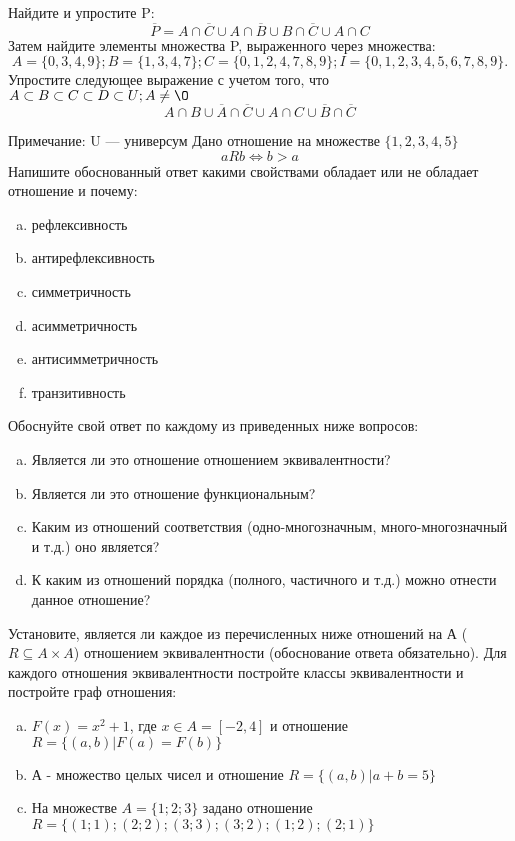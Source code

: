\documentclass[10pt]{exam}
\begin{document}
\begin{questions}
\question
Найдите и упростите P:
\begin{equation*}
\overline{P} = A \cap \overline{C} \cup A \cap \overline{B} \cup B \cap \overline{C} \cup A \cap C
\end{equation*}
Затем найдите элементы множества P, выраженного через множества:
\begin{equation*}
A = \{0, 3, 4, 9\}; 
B = \{1, 3, 4, 7\};
C = \{0, 1, 2, 4, 7, 8, 9\};
I = \{0, 1, 2, 3, 4, 5, 6, 7, 8, 9\}.
\end{equation*}\question
Упростите следующее выражение с учетом того, что $A\subset B \subset C \subset D \subset U; A \neq \O$
\begin{equation*}
A \cap B \cup \overline{A} \cap \overline{C} \cup A \cap C \cup \overline{B} \cap \overline{C}
\end{equation*}

Примечание: U — универсум\question
Дано отношение на множестве $\{1, 2, 3, 4, 5\}$ 
\begin{equation*}
aRb \iff b > a
\end{equation*}
Напишите обоснованный ответ какими свойствами обладает или не обладает отношение и почему:   
\begin{enumerate} [a)]\setcounter{enumi}{0}
\item рефлексивность
\item антирефлексивность
\item симметричность
\item асимметричность
\item антисимметричность
\item транзитивность
\end{enumerate}

Обоснуйте свой ответ по каждому из приведенных ниже вопросов:
\begin{enumerate} [a)]\setcounter{enumi}{0}
    \item Является ли это отношение отношением эквивалентности?
    \item Является ли это отношение функциональным?
    \item Каким из отношений соответствия (одно-многозначным, много-многозначный и т.д.) оно является?
    \item К каким из отношений порядка (полного, частичного и т.д.) можно отнести данное отношение?
\end{enumerate}

\question
Установите, является ли каждое из перечисленных ниже отношений на А ($R \subseteq A \times A$) отношением эквивалентности (обоснование ответа обязательно). Для каждого отношения эквивалентности постройте классы эквивалентности и постройте граф отношения:
\begin{enumerate} [a)]\setcounter{enumi}{0}
\item $F(x)=x^{2}+1$, где $x \in A = [-2, 4]$ и отношение $R = \{(a,b)|F(a) = F(b)\}$
\item А - множество целых чисел и отношение $R = \{(a,b)|a + b = 5\}$
\item На множестве $A = \{1; 2; 3\}$ задано отношение $R = \{(1; 1); (2; 2); (3; 3); (3; 2); (1; 2); (2; 1)\}$


\end{enumerate}
\end{questions}
\end{document}
